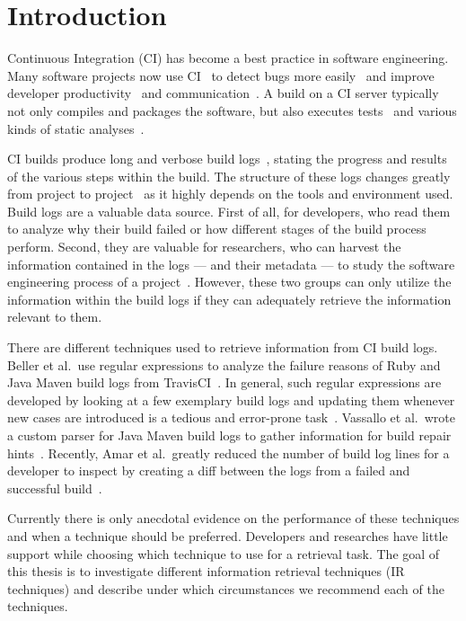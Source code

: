 \documentclass[\myrootdir/main.tex]{subfiles}
\begin{document}
\chapter{Introduction}
Continuous Integration (CI) has become a best practice in software engineering.
Many software projects now use CI~\cite{hilton2016usage,staahl2014modeling,beller2017oops} to detect bugs more easily~\cite{vasilescu2015quality,duvall2007continuous} and improve developer productivity~\cite{miller2008hundred,hilton2016usage} and communication~\cite{downs2012ambient}.
A build on a CI server typically not only compiles and packages the software, but also executes tests~\cite{beller2017oops} and various kinds of static analyses~\cite{zampetti2017open}.

CI builds produce long and verbose build logs~\cite{beller2017oops}, stating the progress and results of the various steps within the build.
The structure of these logs changes greatly from project to project~\cite{staahl2014modeling} as it highly depends on the tools and environment used.
Build logs are a valuable data source. First of all, for developers, who read them to analyze why their build failed or how different stages of the build process perform.
Second, they are valuable for researchers, who can harvest the information contained in the logs --- and their metadata --- to study the software engineering process of a project~\cite{rausch2017empirical,beller2017oops,seo2014programmers,vassallo2017a-tale}.
However, these two groups can only utilize the information within the build logs if they can adequately retrieve the information relevant to them.

There are different techniques used to retrieve information from CI build logs. Beller et al.\ use regular expressions to analyze the failure reasons of Ruby and Java Maven build logs from TravisCI~\cite{beller2017oops}.
In general, such regular expressions are developed by looking at a few exemplary build logs and updating them whenever new cases are introduced is a tedious and error-prone task~\cite{michael2019regexes}.
Vassallo et al.\ wrote a custom parser for Java Maven build logs to gather information for build repair hints~\cite{vassallo2018un-break}.
Recently, Amar et al.\ greatly reduced the number of build log lines for a developer to inspect by creating a diff between the logs from a failed and successful build~\cite{amar2019mining}.

Currently there is only anecdotal evidence on the performance of these techniques and when a technique should be preferred.
Developers and researches have little support while choosing which technique to use for a retrieval task.
The goal of this thesis is to investigate different information retrieval techniques (IR techniques) and describe under which circumstances we recommend each of the techniques.
\end{document}
